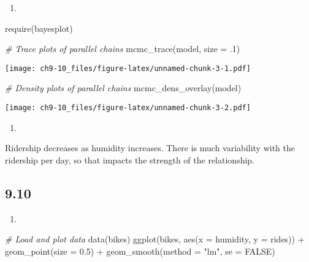 \documentclass[
]{article}
\newenvironment{Shaded}{\begin{snugshade}}{\end{snugshade}}
\newcommand{\AttributeTok}[1]{\textcolor[rgb]{0.77,0.63,0.00}{#1}}
\newcommand{\CommentTok}[1]{\textcolor[rgb]{0.56,0.35,0.01}{\textit{#1}}}
\newcommand{\ConstantTok}[1]{\textcolor[rgb]{0.00,0.00,0.00}{#1}}
\newcommand{\DecValTok}[1]{\textcolor[rgb]{0.00,0.00,0.81}{#1}}
\newcommand{\FloatTok}[1]{\textcolor[rgb]{0.00,0.00,0.81}{#1}}
\newcommand{\FunctionTok}[1]{\textcolor[rgb]{0.00,0.00,0.00}{#1}}
\newcommand{\NormalTok}[1]{#1}
\newcommand{\SpecialCharTok}[1]{\textcolor[rgb]{0.00,0.00,0.00}{#1}}
\newcommand{\StringTok}[1]{\textcolor[rgb]{0.31,0.60,0.02}{#1}}
\providecommand{\tightlist}{%
  \setlength{\itemsep}{0pt}\setlength{\parskip}{0pt}}
\begin{document}
\begin{enumerate}
\def\labelenumi{\alph{enumi}.}
\setcounter{enumi}{2}
\tightlist
\item
\end{enumerate}

\begin{Shaded}
\begin{Highlighting}[]
\FunctionTok{require}\NormalTok{(bayesplot)}

\CommentTok{\# Trace plots of parallel chains}
\FunctionTok{mcmc\_trace}\NormalTok{(model, }\AttributeTok{size =}\NormalTok{ .}\DecValTok{1}\NormalTok{)}
\end{Highlighting}
\end{Shaded}

\texttt{[image: ch9-10\_files/figure-latex/unnamed-chunk-3-1.pdf]}

\begin{Shaded}
\begin{Highlighting}[]
\CommentTok{\# Density plots of parallel chains}
\FunctionTok{mcmc\_dens\_overlay}\NormalTok{(model)}
\end{Highlighting}
\end{Shaded}

\texttt{[image: ch9-10\_files/figure-latex/unnamed-chunk-3-2.pdf]}

\begin{enumerate}
\def\labelenumi{\alph{enumi}.}
\setcounter{enumi}{3}
\tightlist
\item
\end{enumerate}

Ridership decreases as humidity increases. There is much variability
with the ridership per day, so that impacts the strength of the
relationship.

\hypertarget{section-1}{%
\subsection{9.10}\label{section-1}}

\begin{enumerate}
\def\labelenumi{\alph{enumi}.}
\tightlist
\item
\end{enumerate}

\begin{Shaded}
\begin{Highlighting}[]
\CommentTok{\# Load and plot data}
\FunctionTok{data}\NormalTok{(bikes)}
\FunctionTok{ggplot}\NormalTok{(bikes, }\FunctionTok{aes}\NormalTok{(}\AttributeTok{x =}\NormalTok{ humidity, }\AttributeTok{y =}\NormalTok{ rides)) }\SpecialCharTok{+} 
  \FunctionTok{geom\_point}\NormalTok{(}\AttributeTok{size =} \FloatTok{0.5}\NormalTok{) }\SpecialCharTok{+} 
  \FunctionTok{geom\_smooth}\NormalTok{(}\AttributeTok{method =} \StringTok{"lm"}\NormalTok{, }\AttributeTok{se =} \ConstantTok{FALSE}\NormalTok{)}
\end{Highlighting}
\end{Shaded}
\end{document}
